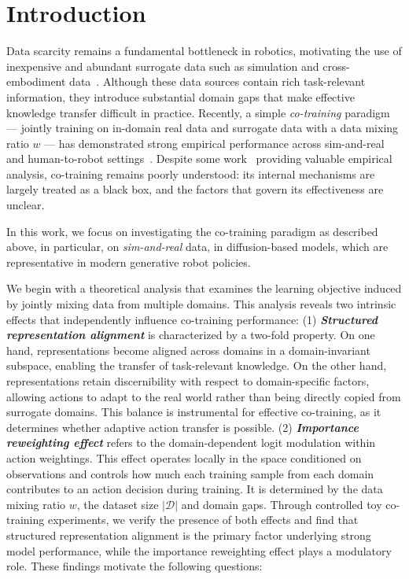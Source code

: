 \section{Introduction}
\label{sec:intro}

Data scarcity remains a fundamental bottleneck in robotics, motivating the use of inexpensive and abundant surrogate data such as simulation and cross-embodiment data~\cite{bjorck2025gr00t, intelligence2025pi}. 
Although these data sources contain rich task-relevant information, they introduce substantial domain gaps that make effective knowledge transfer difficult in practice. 
Recently, a simple \textit{co-training} paradigm — jointly training on in-domain real data and surrogate data with a data mixing ratio $w$ — has demonstrated strong empirical performance across sim-and-real and human-to-robot settings~\cite{cheng2025generalizable, yuan2025motiontrans, kareer2025egomimic, kareer2025emergence}. 
Despite some work~\cite{wei2025empirical} providing valuable empirical analysis, co-training remains poorly understood: its internal mechanisms are largely treated as a black box, and the factors that govern its effectiveness are unclear.

In this work, we focus on investigating the co-training paradigm as described above, in particular, on \textit{sim-and-real} data, in diffusion-based models, which are representative in modern generative robot policies.~\cite{pan2025much}



We begin with a theoretical analysis that examines the learning objective induced by jointly mixing data from multiple domains.
This analysis reveals two intrinsic effects that independently influence co-training performance:
(1) \textbf{\emph{Structured representation alignment}} is characterized by a two-fold property. On one hand, representations become aligned across domains in a domain-invariant subspace, enabling the transfer of task-relevant knowledge. On the other hand, representations retain discernibility with respect to domain-specific factors, allowing actions to adapt to the real world rather than being directly copied from surrogate domains.
This balance is instrumental for effective co-training, as it determines whether adaptive action transfer is possible.
(2) \textbf{\emph{Importance reweighting effect}} refers to the domain-dependent logit modulation within action weightings.
This effect operates locally in the space conditioned on observations and controls how much each training sample from each domain contributes to an action decision during training.
It is determined by the data mixing ratio $w$, the dataset size $|\mathcal{D}|$ and domain gaps.
Through controlled toy co-training experiments, we verify the presence of both effects and find that structured representation alignment is the primary factor underlying strong model performance, while the importance reweighting effect plays a modulatory role.
These findings motivate the following questions:

